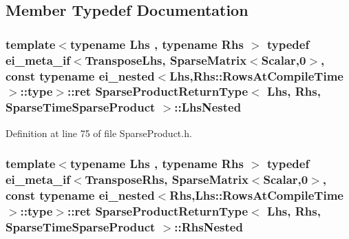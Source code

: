 \subsection{Member Typedef Documentation}
\hypertarget{struct_sparse_product_return_type_3_01_lhs_00_01_rhs_00_01_sparse_time_sparse_product_01_4_a9291f9481846fe6baef1c645df03180a}{
\subsubsection[{Lhs\-Nested}]{\setlength{\rightskip}{0pt plus 5cm}template$<$typename Lhs , typename Rhs $>$ typedef {\bf ei\-\_\-meta\-\_\-if}$<${\bf Transpose\-Lhs}, {\bf Sparse\-Matrix}$<${\bf Scalar},0$>$, const typename {\bf ei\-\_\-nested}$<$Lhs,Rhs\-::\-Rows\-At\-Compile\-Time$>$\-::{\bf type}$>$\-::{\bf ret} {\bf Sparse\-Product\-Return\-Type}$<$ Lhs, Rhs, {\bf Sparse\-Time\-Sparse\-Product} $>$\-::{\bf Lhs\-Nested}}}\label{struct_sparse_product_return_type_3_01_lhs_00_01_rhs_00_01_sparse_time_sparse_product_01_4_a9291f9481846fe6baef1c645df03180a}


Definition at line 75 of file Sparse\-Product.\-h.

\hypertarget{struct_sparse_product_return_type_3_01_lhs_00_01_rhs_00_01_sparse_time_sparse_product_01_4_aeb21908c46a3a9a5d0418934aede1f49}{
\subsubsection[{Rhs\-Nested}]{\setlength{\rightskip}{0pt plus 5cm}template$<$typename Lhs , typename Rhs $>$ typedef {\bf ei\-\_\-meta\-\_\-if}$<${\bf Transpose\-Rhs}, {\bf Sparse\-Matrix}$<${\bf Scalar},0$>$, const typename {\bf ei\-\_\-nested}$<$Rhs,Lhs\-::\-Rows\-At\-Compile\-Time$>$\-::{\bf type}$>$\-::{\bf ret} {\bf Sparse\-Product\-Return\-Type}$<$ Lhs, Rhs, {\bf Sparse\-Time\-Sparse\-Product} $>$\-::{\bf Rhs\-Nested}}}\label{struct_sparse_product_return_type_3_01_lhs_00_01_rhs_00_01_sparse_time_sparse_product_01_4_aeb21908c46a3a9a5d0418934aede1f49}


